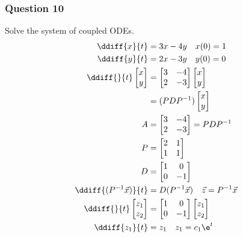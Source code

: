 \documentclass{math}
\begin{document}
\subsubsection*{Question 10}
Solve the system of coupled ODEs.
\begin{align*}
  \ddiff{x}{t} &= 3x-4y \quad x(0) = 1 \\
  \ddiff{y}{t} &= 2x-3y \quad y(0) = 0 \\
  \ddiff{}{t}\begin{bmatrix}x \\ y\end{bmatrix} &=
    \begin{bmatrix}3 & -4 \\ 2 & -3\end{bmatrix}
    \begin{bmatrix}x \\ y\end{bmatrix} \\
  &= (PDP^{-1})\begin{bmatrix}x \\ y\end{bmatrix} \\
  A &= \begin{bmatrix}3 & -4 \\ 2 & -3\end{bmatrix} = PDP^{-1} \\
  P &= \begin{bmatrix}2 & 1 \\ 1 & 1\end{bmatrix} \\
  D &= \begin{bmatrix}1 & 0 \\ 0 & -1\end{bmatrix} \\
  \ddiff{(P^{-1}\vec{x})}{t} &= D(P^{-1}\vec{x}) \quad
    \vec{z} = P^{-1}\vec{x} \\
  \ddiff{}{t}\begin{bmatrix}z_1 \\ z_2\end{bmatrix} &=
    \begin{bmatrix}1 & 0 \\ 0 & -1\end{bmatrix}
    \begin{bmatrix}z_1 \\ z_2\end{bmatrix} \\
  \ddiff{z_1}{t} &= z_1 \quad z_1 = c_1\e^{t} \\

\end{align*}
\end{document}
